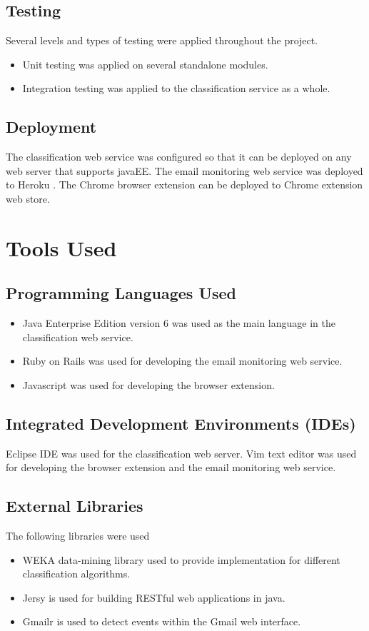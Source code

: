 \subsection{Testing}
Several levels and types of testing were applied throughout the project.
\begin{itemize}
  \item Unit testing was applied on several standalone modules.
  \item Integration testing was applied to the classification service as a whole.
\end{itemize}

\subsection{Deployment}
The classification web service was configured so that it can be deployed on any 
web server that supports javaEE. The email monitoring web service was deployed 
to Heroku \cite{HEROKU}. The Chrome browser extension can be deployed to Chrome 
extension web store.

\section{Tools Used}
\label{sec:5_tools_used}

\subsection{Programming Languages Used}
\begin{itemize}
  \item Java Enterprise Edition version 6 was used as the main language in the 
  classification web service.
  \item Ruby on Rails \cite{ROR} was used for developing the email monitoring 
  web service.
  \item Javascript was used for developing the browser extension.
\end{itemize}

\subsection{Integrated Development Environments (IDEs)}
Eclipse IDE was used for the classification web server.
Vim text editor was used for developing the browser extension and the email 
monitoring web service.

\subsection{External Libraries}
The following libraries were used
\begin{itemize}
  \item WEKA \cite{WEKA} data-mining library used to provide implementation for different classification algorithms.
  \item Jersy \cite{JERSY} is used for building RESTful web applications in java.
  \item Gmailr \cite{GMAILR} is used to detect events within the Gmail web interface.
\end{itemize}


